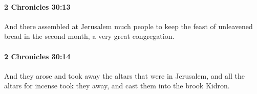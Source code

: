 		\paragraph{2 Chronicles 30:13} %
			\label{2CHRONICLES-30-13}

			And there assembled at Jerusalem much people to keep the feast of unleavened bread in the second month, a very great congregation.


		\paragraph{2 Chronicles 30:14} %
			\label{2CHRONICLES-30-14}

			And they arose and took away the altars that were in Jerusalem, and all the altars for incense took they away, and cast them into the brook Kidron.



